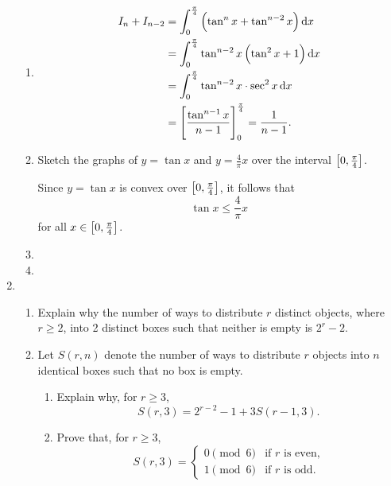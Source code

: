 \begin{enumerate}
\begin{solution} \
\begin{enumerate}[label=(\roman*)]
\item \begin{align*}
I_n+I_{n-2}
&=\int_0^\frac{\pi}{4}\left(\tan^nx+\tan^{n-2}x\right)\dd{x}\\
&=\int_0^\frac{\pi}{4}\tan^{n-2}x\left(\tan^2x+1\right)\dd{x}\\
&=\int_0^\frac{\pi}{4}\tan^{n-2}x\cdot\sec^2x\dd{x}\\
&=\left[\frac{\tan^{n-1}x}{n-1}\right]_0^\frac{\pi}{4}=\frac{1}{n-1}.
\end{align*}

\item Sketch the graphs of $y=\tan x$ and $y=\frac{4}{\pi}x$ over the interval $\left[0,\frac{\pi}{4}\right]$.

Since $y=\tan x$ is convex over $\left[0,\frac{\pi}{4}\right]$, it follows that
\[ \tan x\le\frac{4}{\pi}x \]
for all $x\in\left[0,\frac{\pi}{4}\right]$.

\item 

\item 
\end{enumerate}
\end{solution}

\item \begin{enumerate}[label=(\roman*)]
\item Explain why the number of ways to distribute $r$ distinct objects, where $r\ge2$, into 2 distinct boxes such that neither is empty is $2^r-2$.
\item Let $S(r,n)$ denote the number of ways to distribute $r$ objects into $n$ identical boxes such that no box is empty.
\begin{enumerate}[label=(\alph*)]
    \item Explain why, for $r\ge3$,
    \[ S(r,3)=2^{r-2}-1+3S(r-1,3). \]
    \item Prove that, for $r\ge3$,
    \[ S(r,3)=\begin{cases}
    0\pmod6 & \text{if }r\text{ is even,}\\
    1\pmod6 & \text{if }r\text{ is odd.}
    \end{cases} \]
\end{enumerate}
\end{enumerate}
\end{enumerate}
\pagebreak

